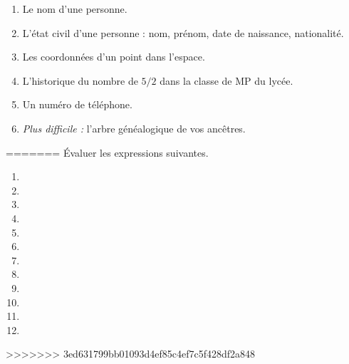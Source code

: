\begin{enumerate}[label = \emph{\alph*)}]
  \item Le nom d'une personne.
  \item L'état civil d'une personne : nom, prénom, date de naissance, nationalité.
  \item Les coordonnées d'un point dans l'espace.
  \item L'historique du nombre de $5/2$ dans la classe de MP du lycée. 
  \item Un numéro de téléphone. 
  \item \emph{Plus difficile :} l'arbre généalogique de vos ancêtres. 
\end{enumerate}
=======
\'Evaluer les expressions suivantes.
\begin{multicols}{2}
  \begin{enumerate}[label=\emph{\alph*)}]
    \item {}
    \item {}
    \item {}
    \item {}
    \item {}
    \item {}
    \item {}
    \item {}
    \item {}
    \item {}
    \item {}
    \item {}
  \end{enumerate}
\end{multicols}
>>>>>>> 3ed631799bb01093d4ef85c4ef7c5f428df2a848
